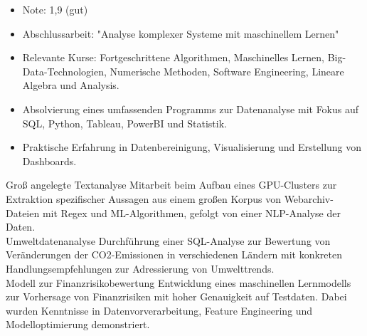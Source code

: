 \documentclass[9pt,a4paper,ragged2e,withhyper]{altacv}
\begin{document}
\begin{paracol}{2}
            \begin{itemize}
                \item Note: 1,9 (gut)
                \item Abschlussarbeit: "Analyse komplexer Systeme mit maschinellem Lernen"
                \item Relevante Kurse: Fortgeschrittene Algorithmen, Maschinelles Lernen, Big-Data-Technologien, Numerische Methoden, Software Engineering, Lineare Algebra und Analysis.
            \end{itemize}
            \vspace{0.5em}
            \begin{itemize}
                \item Absolvierung eines umfassenden Programms zur Datenanalyse mit Fokus auf SQL, Python, Tableau, PowerBI und Statistik.
                \item Praktische Erfahrung in Datenbereinigung, Visualisierung und Erstellung von Dashboards.
            \end{itemize}
            \vspace{0.5em}
        
        \cvevent
            { Groß angelegte Textanalyse }
            {  }
            {}
            {}
        Mitarbeit beim Aufbau eines GPU-Clusters zur Extraktion spezifischer Aussagen aus einem großen Korpus von Webarchiv-Dateien mit Regex und ML-Algorithmen, gefolgt von einer NLP-Analyse der Daten.\\
        \vspace{0.5em}
        \cvevent
            { Umweltdatenanalyse }
            {  }
            {}
            {}
        Durchführung einer SQL-Analyse zur Bewertung von Veränderungen der CO2-Emissionen in verschiedenen Ländern mit konkreten Handlungsempfehlungen zur Adressierung von Umwelttrends.\\
        \vspace{0.5em}
        \cvevent
            { Modell zur Finanzrisikobewertung }
            {  }
            {}
            {}
        Entwicklung eines maschinellen Lernmodells zur Vorhersage von Finanzrisiken mit hoher Genauigkeit auf Testdaten. Dabei wurden Kenntnisse in Datenvorverarbeitung, Feature Engineering und Modelloptimierung demonstriert.\\
        \vspace{0.5em}

        
    \end{paracol}
\end{document}
